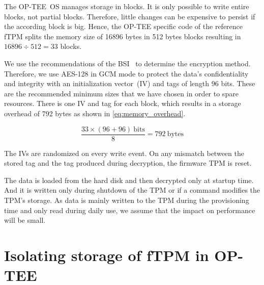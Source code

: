 The OP-TEE~OS manages storage in blocks.
It is only possible to write entire blocks, not partial blocks.
Therefore, little changes can be expensive to persist if the according block is big.
Hence, the OP-TEE specific code of the reference fTPM splits the memory size of 16896 bytes in 512 bytes blocks resulting in \( 16896 \div 512 = 33 \) blocks.

We use the recommendations of the BSI~\cite{bsi-key-recommendations} to determine the encryption method.
Therefore, we use AES-128 in GCM mode to protect the data's confidentiality and integrity with an initialization vector~(IV) and tags of length 96 bits.
These are the recommended minimum sizes that we have chosen in order to spare resources.
There is one IV and tag for each block, which results in a storage overhead of 792 bytes as shown in \autoref{eq:memory_overhead}.

\begin{equation}
  \label{eq:memory_overhead}
  \frac{33 \times (96 + 96)\ \text{bits}}{8} = 792\ \text{bytes}
\end{equation}

The IVs are randomized on every write event.
On any mismatch between the stored tag and the tag produced during decryption, the firmware TPM is reset. 

The data is loaded from the hard disk and then decrypted only at startup time.
And it is written only during shutdown of the TPM or if a command modifies the TPM's storage.
As data is mainly written to the TPM during the provisioning time and only read during daily use, we assume that the impact on performance will be small.

\section{Isolating storage of fTPM in OP-TEE}


